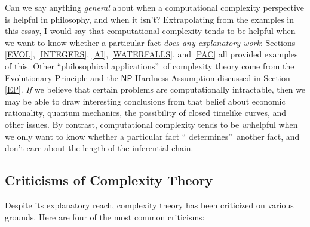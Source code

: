 \documentclass[12pt,onecolumn]{article}%
\begin{document}
Can we say anything \textit{general} about when a computational complexity
perspective is helpful in philosophy, and when it isn't? Extrapolating from
the examples in this essay, I would say that computational complexity tends to
be helpful when we want to know whether a particular fact \textit{does any
explanatory work}: Sections \ref{EVOL}, \ref{INTEGERS}, \ref{AI},
\ref{WATERFALLS}, and \ref{PAC} all provided examples of this. Other
\textquotedblleft philosophical applications\textquotedblright\  of complexity
theory come from the Evolutionary Principle and the $\mathsf{NP}$ Hardness
Assumption discussed in Section \ref{EP}. \textit{If} we believe that
certain problems are computationally intractable, then we may be able to draw
interesting conclusions from that belief about economic rationality, quantum
mechanics, the possibility of closed timelike curves, and other issues. By
contrast, computational complexity tends to be \textit{un}helpful when we only
want to know whether a particular fact \textquotedblleft
determines\textquotedblright\  another fact, and don't care about the length of
the inferential chain.

\subsection{Criticisms of Complexity Theory\label{CRITICISMS}}

Despite its explanatory reach, complexity theory has been criticized on
various grounds. Here are four of the most common criticisms:
\end{document}
